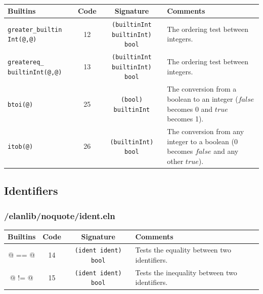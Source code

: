~\\
\begin{tabular}{|p{3cm}|c|c|p{}|}
\hline
{\bf Builtins} & {\bf Code} & {\bf Signature} & {\bf Comments} \\
\hline
\hline
{\tt greater\_builtin Int(@,@)}         & 12 & {\tt (builtinInt builtinInt) bool} & The ordering test between integers.\\
{\tt greatereq\_ builtinInt(@,@)}       & 13 & {\tt (builtinInt builtinInt) bool} & The ordering test between integers.\\
{\tt btoi(@)}                           & 25 & {\tt (bool) builtinInt} & The conversion from a boolean to an integer ($false$ becomes 0 and $true$ becomes 1).\\
{\tt itob(@)}                           & 26 & {\tt (builtinInt) bool} & The conversion from any integer to a boolean (0 becomes $false$ and any other $true$).\\
\hline
\end{tabular}


\subsection{Identifiers}

%

\subsubsection{/elanlib/noquote/ident.eln}


\begin{tabular}{|c|c|c|p{9cm}|}
\hline
{\bf Builtins} & {\bf Code} & {\bf Signature} & {\bf Comments} \\
\hline
\hline
@ == @  & 14 & {\tt (ident ident) bool} & Tests the equality between two identifiers.\\
@ != @  & 15 & {\tt (ident ident) bool} & Tests the inequality between two identifiers.\\
\hline
\end{tabular}




